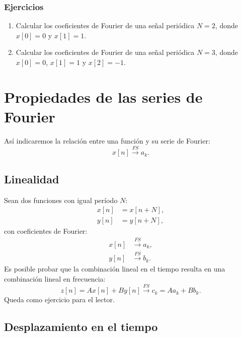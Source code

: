 \subsubsection{Ejercicios}

\begin{enumerate}
	\item Calcular los coeficientes de Fourier de una señal periódica $N = 2$, donde $x[0] = 0$ y $x[1] = 1$.
	\item Calcular los coeficientes de Fourier de una señal periódica $N = 3$, donde $x[0] = 0$, $x[1] = 1$ y $x[2] = -1$.
\end{enumerate}

\section{Propiedades de las series de Fourier}

Así indicaremos la relación entre una función y su serie de Fourier:
\begin{equation}
	x[n] \xrightarrow{FS} a_{k}.
\end{equation}

\subsection{Linealidad}

Sean dos funciones con igual período $N$:
\begin{align}
	x[n] &= x[n+N], \\
	y[n] &= y[n+N],
\end{align}
con coeficientes de Fourier:
\begin{align}
	x[n] &\xrightarrow{FS} a_{k}, \\
	y[n] &\xrightarrow{FS} b_{k}.
\end{align}
Es posible probar que la combinación lineal en el tiempo resulta en una combinación lineal en frecuencia:
\begin{equation}
	z[n] = A x[n] + B y[n] \xrightarrow{FS} c_{k} = A a_{k} + B b_{k}.
\end{equation}
Queda como ejercicio para el lector.

\subsection{Desplazamiento en el tiempo}

